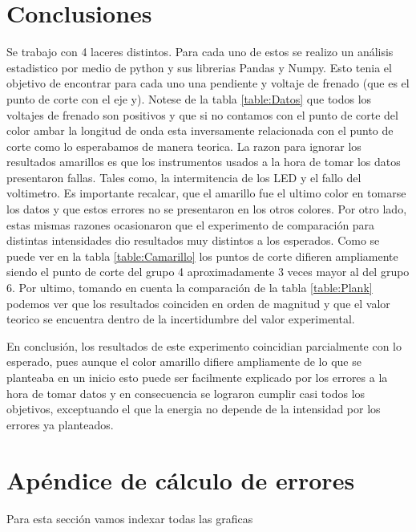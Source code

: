 \documentclass[a4paper, amsfonts, amssymb, amsmath, reprint, showkeys, nofootinbib, twoside]{revtex4-1}
\begin{document}
\section{Conclusiones}
Se trabajo con 4 laceres distintos. Para cada uno de estos se realizo un análisis estadistico por medio de python y sus librerias Pandas y Numpy. Esto tenia el objetivo de encontrar para cada uno una pendiente y voltaje de frenado (que es el punto de corte con el eje y). Notese de la tabla \ref{table:Datos} que todos los voltajes de frenado son positivos y que si no contamos con el punto de corte del color ambar la longitud de onda esta inversamente relacionada con el punto de corte como lo esperabamos de manera teorica. La razon para ignorar los resultados amarillos es que los instrumentos usados a la hora de tomar los datos presentaron fallas. Tales como, la intermitencia de los LED y el fallo del voltimetro. Es importante recalcar, que el amarillo fue el ultimo color en tomarse los datos y que estos errores no se presentaron en los otros colores. Por otro lado, estas mismas razones ocasionaron que el experimento de comparación para distintas intensidades dio resultados muy distintos a los esperados. Como se puede ver en la tabla \ref{table:Camarillo} los puntos de corte difieren ampliamente siendo el punto de corte del grupo 4 aproximadamente 3 veces mayor al del grupo 6. Por ultimo, tomando en cuenta la comparación de la tabla \ref{table:Plank} podemos ver que los resultados coinciden en orden de magnitud y que el valor teorico se encuentra dentro de la incertidumbre del valor experimental. 

En conclusión, los resultados de este experimento coincidian parcialmente con lo esperado, pues aunque el color amarillo difiere ampliamente de lo que se planteaba en un inicio esto puede ser facilmente explicado por los errores a la hora de tomar datos y en consecuencia se lograron cumplir casi todos los objetivos, exceptuando el que la energia no depende de la intensidad por los errores ya planteados.


\section*{Apéndice de cálculo de errores}
Para esta sección vamos indexar todas las graficas
\end{document}
